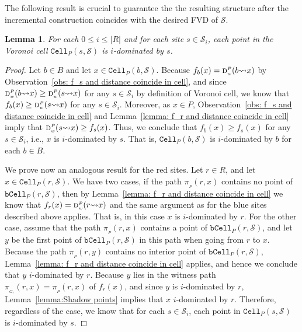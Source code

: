 \documentclass[a4paper, 11pt]{article}
\newtheorem{lemma}[theorem]{Lemma}
\newcommand{\idom}[1][i]{${#1}$-dominated\xspace}
\newcommand{\s}{\mathcal S}
\newcommand{\dd}[3][P]{\ensuremath{\textsc{d}_{\scriptscriptstyle w}^{\scriptscriptstyle #1}(#2 {\leadsto} #3)}}
\newcommand{\p}[3][P]{\ensuremath{\pi_{_{#1}}(#2, #3)}}
\newcommand{\cell}[2][P]{\ensuremath{\mathtt{Cell}_{\scriptscriptstyle #1}(#2)}}
\newcommand{\bcell}[2][P]{\ensuremath{\mathtt{bCell}_{\scriptscriptstyle #1}(#2)}}
\begin{document}
The following result is crucial to guarantee the the resulting structure after the incremental construction coincides with the desired FVD of $\s$.

\begin{lemma}\label{lemma:Patch contains vcell} 
For each $0\leq i \leq |R|$ and for each site $s\in \s_i$, 
each point in the Voronoi cell $\cell{s, \s}$ is \idom by $s$.
\end{lemma}
\begin{proof}
Let $b\in B$ and let $x\in \cell{b, \s}$. 
Because $f_b(x) = \dd{b}{x}$ by Observation~\ref{obs: f_s and distance coincide in cell}, and since $\dd{b}{x} \geq \dd{s}{x}$ for any $s\in \s_i$ by definition of Voronoi cell, we know that $f_b(x) \geq \dd{s}{x}$ for any $s\in \s_i$. Moreover, as $x\in P$, Observation~\ref{obs: f_s and distance coincide in cell} and Lemma~\ref{lemma: f_r and distance coincide in cell} imply that $\dd{s}{x} \geq f_s(x)$. 
Thus, we conclude that $f_b(x) \geq f_s(x)$ for any $s\in \s_i$, i.e., $x$ is \idom by $s$. That is, $\cell{b, \s}$ is \idom by $b$ for each $b\in B$.

We prove now an analogous result for the red sites.
Let $r\in R$, and let $x\in \cell{r, \s}$.  We have two cases, if the path $\p{r}{x}$ contains no point of $\bcell{r, \s}$, then by Lemma~\ref{lemma: f_r and distance coincide in cell} we know that $f_r(x) = \dd{r}{x}$ and the same argument as for the blue sites described above applies. That is, in this case $x$ is \idom by $r$.
For the other case, assume that the path $\p{r}{x}$ contains a point of $\bcell{r, \s}$, and let $y$ be the first point of $\bcell{r, \s}$ in this path when going from $r$ to $x$.
Because the path $\p{r}{y}$ contains no interior point of $\bcell{r, \s}$, Lemma~\ref{lemma: f_r and distance coincide in cell} applies, and hence we conclude that $y$ \idom by $r$.
Because $y$ lies in the witness path $\p[G_r]{r}{x} = \p{r}{x}$ of $f_r(x)$, and since $y$ is \idom by $r$, Lemma~\ref{lemma:Shadow points} implies that $x$ \idom by $r$.
Therefore, regardless of the case, we know that for each $s\in \s_i$, each point in $\cell{s, \s}$ is \idom by $s$.
\end{proof}
\end{document}
